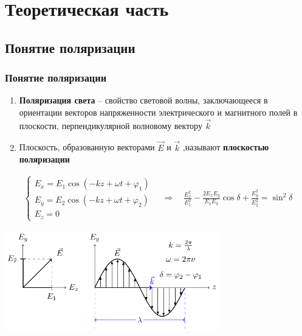 \documentclass[10pt,pdf,hyperref={unicode}, dvipsnames]{beamer}
\begin{document}
\section{Теоретическая часть}
\begin{frame}[t]
	\subsection{Понятие поляризации}
	\frametitle{Понятие поляризации}
	\begin{enumerate}
		\item \textbf{Поляризация света} -- свойство световой волны, заключающееся в  ориентации векторов напряженности электрического и магнитного полей в плоскости, перпендикулярной волновому вектору $\vec{k}$
		\item Плоскость, образованную векторами $\vec{E}$ и $\vec{k}$ ,называют \textbf{плоскостью поляризации}
	\end{enumerate}
	\begin{gather*}
		\begin{cases} 
			E_x = E_1\cos\left(-kz+\omega t+ \varphi_1\right) \\
			E_y = E_2\cos\left(-kz+\omega t+ \varphi_2\right) \\
			E_z = 0
		\end{cases}
		\quad\Rightarrow\quad
		\frac{E_x^2}{E_1^2}-\frac{2E_xE_y}{E_1E_2}\cos\delta+\frac{E_y^2}{E_2^2}=\sin^2\delta
	\end{gather*}
	\begin{center}
		\includegraphics[width=0.7\textwidth]{images/polarisation}
	\end{center}
\end{frame}

\end{document}
